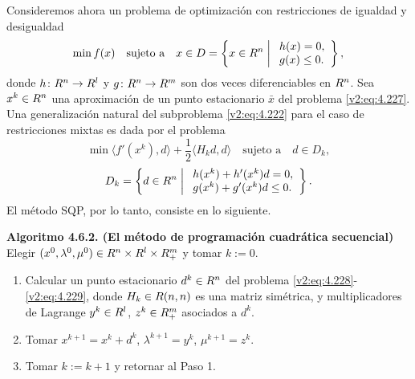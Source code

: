 Consideremos ahora un problema de optimización con restricciones de igualdad y desigualdad
\begin{equation}
    \min f(x) \quad \text{sujeto a} \quad x \in D = \left\{ x \in R^n \;\middle|\; \begin{array}{l} h(x) = 0, \\ g(x) \le 0. \end{array} \right\},
    \label{v2:eq:4.227}
\end{equation}
donde $h \colon R^n \to R^l$ y $g \colon R^n \to R^m$ son dos veces diferenciables en $R^n$.
Sea $x^k \in R^n$ una aproximación de un punto estacionario $\bar{x}$ del problema \eqref{v2:eq:4.227}. Una generalización natural del subproblema \eqref{v2:eq:4.222} para el caso de restricciones mixtas es dada por el problema
\begin{equation}
    \min \langle f'(x^k), d \rangle + \frac{1}{2}\langle H_k d, d \rangle \quad \text{sujeto a} \quad d \in D_k,
    \label{v2:eq:4.228}
\end{equation}
\begin{equation}
    D_k = \left\{ d \in R^n \;\middle|\; \begin{array}{l} h(x^k) + h'(x^k)d = 0, \\ g(x^k) + g'(x^k)d \le 0. \end{array} \right\}.
    \label{v2:eq:4.229}
\end{equation}
El método SQP, por lo tanto, consiste en lo siguiente.

\noindent \textbf{Algoritmo 4.6.2. (El método de programación cuadrática secuencial)} \\
Elegir $(x^0, \lambda^0, \mu^0) \in R^n \times R^l \times R^m_+$ y tomar $k := 0$.
\begin{enumerate}
    \item Calcular un punto estacionario $d^k \in R^n$ del problema \eqref{v2:eq:4.228}-\eqref{v2:eq:4.229}, donde $H_k \in R(n, n)$ es una matriz simétrica, y multiplicadores de Lagrange $y^k \in R^l$, $z^k \in R^m_+$ asociados a $d^k$.
    \item Tomar $x^{k+1} = x^k + d^k$, $\lambda^{k+1} = y^k$, $\mu^{k+1} = z^k$.
    \item Tomar $k := k + 1$ y retornar al Paso 1.
\end{enumerate}

